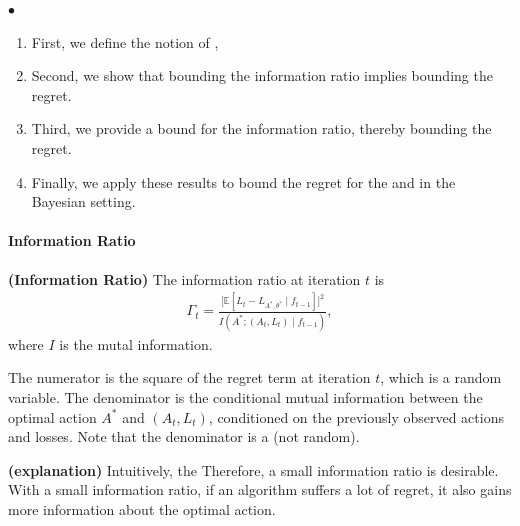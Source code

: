 \documentclass{article}
\newcommand{\bfs}[1]{\textbf{({#1}) }}
\begin{document}
$\bullet$ 
\begin{enumerate}
    \item First, we define the notion of , 
    \item Second, we show that bounding the information ratio implies bounding the regret.
    \item Third, we provide a bound for the information ratio, thereby bounding the regret.
    \item Finally, we apply these results to bound the regret for the  and  in the Bayesian setting.
\end{enumerate}
\paragraph{Information Ratio}
\begin{defa}\bfs{Information Ratio}
 The information ratio at iteration $t$ is
\begin{align*}
\Gamma_{t}=\frac{\big[\mathbb{E}\left[L_{t}-L_{A^{*}, \theta^{*}} \mid f_{t-1}\right]\big]^{2}}{I\left(A^{*} ;\left(A_{t}, L_{t}\right) \mid f_{t-1}\right)},
\end{align*}
where $I$ is the mutal information.
\end{defa}
\begin{rema}
The numerator is the square of the regret term at iteration $t$, which is a random variable. The denominator is the conditional mutual information between the optimal action $A^{*}$ and $\left(A_{t}, L_{t}\right)$, conditioned on the previously observed actions and losses. Note that the denominator is a  (not random).
\end{rema} 
\begin{rema}\bfs{explanation}
Intuitively, the  Therefore, a small information ratio is desirable. With a small information ratio, if an algorithm suffers a lot of regret, it also gains more information about the optimal action.
\end{rema} 
\end{document}
